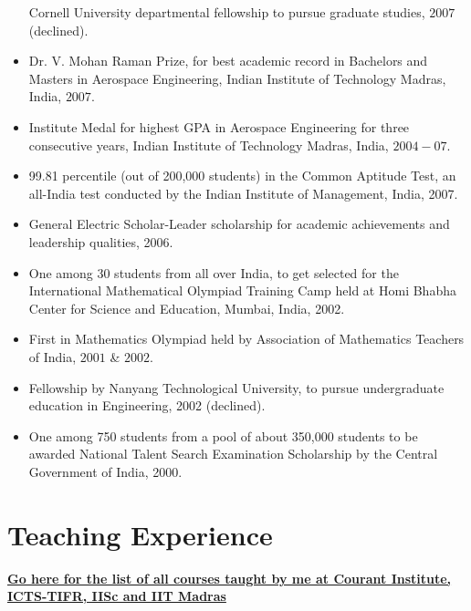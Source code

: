 \documentclass[margin,line]{resume}
\begin{document}
\begin{resume}
\begin{itemize}
	Cornell University departmental fellowship to pursue graduate studies, $2007$ (declined).
	\item
	Dr. V. Mohan Raman Prize, for best academic record in Bachelors and Masters in Aerospace Engineering, Indian Institute of Technology Madras, India, $2007$.
	\item
	Institute Medal for highest GPA in Aerospace Engineering for three consecutive years, Indian Institute of Technology Madras, India, $2004-07$.
	\item
	99.81 percentile (out of 200,000 students) in the Common Aptitude Test, an all-India test conducted by the Indian Institute of Management, India, 2007.
	\item
	General Electric Scholar-Leader scholarship for academic achievements and leadership qualities, 2006.
	\item
	One among 30 students from all over India, to get selected for the International Mathematical Olympiad Training Camp held at Homi Bhabha Center for Science and Education, Mumbai, India, 2002.
	\item
	First in Mathematics Olympiad held by Association of Mathematics Teachers of India, $2001$ \& $2002$.
	\item
	Fellowship by Nanyang Technological University, to pursue undergraduate education in Engineering, 2002 (declined).
	\item
	One among 750 students from a pool of about 350,000 students to be awarded National Talent Search Examination Scholarship by the Central Government of India, 2000.
	\end{itemize}


	\section{\mysidestyle Teaching Experience}
	\vspace{1mm}
	\textbf{\href{https://sivaramambikasaran.com/teaching/}{Go here for the list of all courses taught by me at Courant Institute, ICTS-TIFR, IISc and IIT Madras}}
	


\end{resume}
\end{document}

